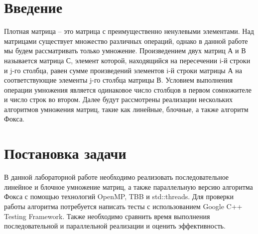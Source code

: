 \documentclass{report}
\begin{document}
\setcounter{page}{2}

\tableofcontents
\newpage

\section*{Введение}

Плотная матрица -- это матрица с преимущественно ненулевыми элементами. Над матрицами существует множество различных операций, однако в данной работе мы будем рассматривать только умножение. Произведением двух матриц А и В называется матрица С, элемент которой, находящийся на пересечении i-й строки и j-го столбца, равен сумме произведений элементов i-й строки матрицы А на соответствующие элементы j-го столбца матрицы В. Условием выполнения операции умножения является одинаковое число столбцов в первом сомножителе и число строк во втором. Далее будут рассмотрены реализации нескольких алгоритмов умножения матриц, такие как линейные, блочные, а также алгоритм Фокса.
\newpage

\section*{Постановка задачи}
В данной лабораторной работе необходимо реализовать последовательное линейное и блочное умножение матриц, а также параллельную версию алгоритма Фокса с помощью технологий OpenMP, TBB и std::threads. Для проверки работы алгоритма потребуется написать тесты с использованием Google C++ Testing Framework. Также необходимо сравнить время выполнения последовательной и параллельной реализации и оценить эффективность.
\newpage
\end{document}
